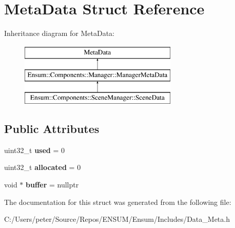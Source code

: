 \hypertarget{struct_meta_data}{}\section{Meta\+Data Struct Reference}
\label{struct_meta_data}
Inheritance diagram for Meta\+Data\+:\begin{figure}[H]
\begin{center}
\leavevmode
\includegraphics[height=3.000000cm]{struct_meta_data}
\end{center}
\end{figure}
\subsection*{Public Attributes}
\begin{DoxyCompactItemize}
\item 
uint32\+\_\+t {\bfseries used} = 0\hypertarget{struct_meta_data_abdcac78a4eaf9c6e69d4fdc0c0f1a1cf}{}\label{struct_meta_data_abdcac78a4eaf9c6e69d4fdc0c0f1a1cf}

\item 
uint32\+\_\+t {\bfseries allocated} = 0\hypertarget{struct_meta_data_ad7f915f404b7b1b3d46a19b0fa6f9a0c}{}\label{struct_meta_data_ad7f915f404b7b1b3d46a19b0fa6f9a0c}

\item 
void $\ast$ {\bfseries buffer} = nullptr\hypertarget{struct_meta_data_a3d09d759d39ddf22e23b3783d82b1c68}{}\label{struct_meta_data_a3d09d759d39ddf22e23b3783d82b1c68}

\end{DoxyCompactItemize}


The documentation for this struct was generated from the following file\+:\begin{DoxyCompactItemize}
\item 
C\+:/\+Users/peter/\+Source/\+Repos/\+E\+N\+S\+U\+M/\+Ensum/\+Includes/Data\+\_\+\+Meta.\+h\end{DoxyCompactItemize}
